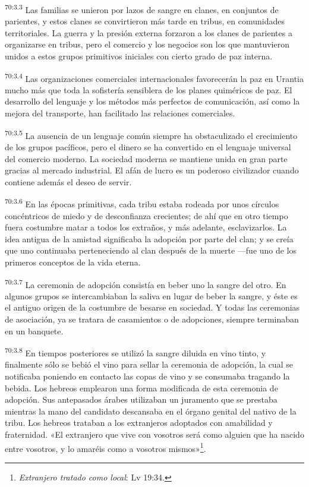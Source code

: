 \par
\textsuperscript{70:3.3} Las familias se unieron por lazos de sangre en clanes, en conjuntos de parientes, y estos clanes se convirtieron más tarde en tribus, en comunidades territoriales. La guerra y la presión externa forzaron a los clanes de parientes a organizarse en tribus, pero el comercio y los negocios son los que mantuvieron unidos a estos grupos primitivos iniciales con cierto grado de paz interna.

\par
\textsuperscript{70:3.4} Las organizaciones comerciales internacionales favorecerán la paz en Urantia mucho más que toda la sofistería sensiblera de los planes quiméricos de paz. El desarrollo del lenguaje y los métodos más perfectos de comunicación, así como la mejora del transporte, han facilitado las relaciones comerciales.

\par
\textsuperscript{70:3.5} La ausencia de un lenguaje común siempre ha obstaculizado el crecimiento de los grupos pacíficos, pero el dinero se ha convertido en el lenguaje universal del comercio moderno. La sociedad moderna se mantiene unida en gran parte gracias al mercado industrial. El afán de lucro es un poderoso civilizador cuando contiene además el deseo de servir.

\par
\textsuperscript{70:3.6} En las épocas primitivas, cada tribu estaba rodeada por unos círculos concéntricos de miedo y de desconfianza crecientes; de ahí que en otro tiempo fuera costumbre matar a todos los extraños, y más adelante, esclavizarlos. La idea antigua de la amistad significaba la adopción por parte del clan; y se creía que uno continuaba perteneciendo al clan después de la muerte ---fue uno de los primeros conceptos de la vida eterna.

\par
\textsuperscript{70:3.7} La ceremonia de adopción consistía en beber uno la sangre del otro. En algunos grupos se intercambiaban la saliva en lugar de beber la sangre, y éste es el antiguo origen de la costumbre de besarse en sociedad. Y todas las ceremonias de asociación, ya se tratara de casamientos o de adopciones, siempre terminaban en un banquete.

\par
\textsuperscript{70:3.8} En tiempos posteriores se utilizó la sangre diluida en vino tinto, y finalmente sólo se bebió el vino para sellar la ceremonia de adopción, la cual se notificaba poniendo en contacto las copas de vino y se consumaba tragando la bebida. Los hebreos emplearon una forma modificada de esta ceremonia de adopción. Sus antepasados árabes utilizaban un juramento que se prestaba mientras la mano del candidato descansaba en el órgano genital del nativo de la tribu. Los hebreos trataban a los extranjeros adoptados con amabilidad y fraternidad. «El extranjero que vive con vosotros será como alguien que ha nacido entre vosotros, y lo amaréis como a vosotros mismos»\footnote{\textit{Extranjero tratado como local}: Lv 19:34.}.

